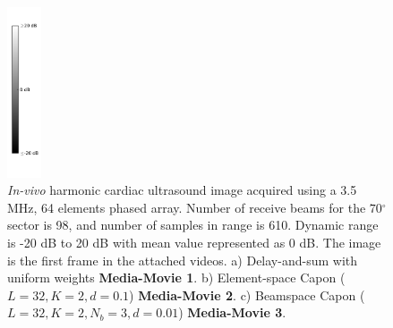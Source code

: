 \documentclass[journal]{IEEEtran}
\newcommand{\degree}{\ensuremath{^\circ}}
\newcommand\multimedia[1]{\textbf{{\color{red}#1}}}
\begin{document}
\begin{figure}[!t]
\centerline{
\hfil
{}
\hfil
{}
\hfil
\includegraphics[width=0.4in]{gfx/colorBarInvivo2.png}
}
\caption{\textit{In-vivo} harmonic cardiac ultrasound image acquired using a 3.5 MHz, 64 elements phased array. Number of receive beams for the $70\degree$ sector is 98, and number of samples in range is 610. Dynamic range is -20 dB to 20 dB with mean value represented as 0 dB. The image is the first frame in the attached videos. a) Delay-and-sum with uniform weights \multimedia{Media-Movie 1}. b) Element-space Capon ($L=32, K=2, d=0.1$) \multimedia{Media-Movie 2}. c) Beamspace Capon ($L=32, K=2, N_b=3, d=0.01$) \multimedia{Media-Movie 3}.}
\label{fig:invivo}
\end{figure}
\end{document}
